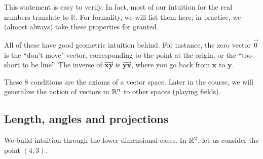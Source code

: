 This statement is easy to verify. In fact, most of our intuition for the real numbers translate to $\mathbb{R}$. For formality, we will list them here; in practice, we (almost always) take these properties for granted.
\begin{remark}
	All of these have good geometric intuition behind. For instance, the zero vector $\vec{0}$ is the ``don't move" vector, corresponding to the point at the origin, or the ``too short to be line''. The inverse of $\overrightarrow{\mathbf{xy}}$ is $\overrightarrow{\mathbf{yx}}$, where you go back from $\mathbf{x}$ to $\mathbf{y}$. \begin{tikzpicture}
		
	\end{tikzpicture}
\end{remark}
\begin{remark}
	These $8$ conditions are the axioms of a vector space. Later in the course, we will generalize the notion of vectors in $\reals^n$ to other spaces (playing fields).
\end{remark}
\subsection{Length, angles and projections}
We build intuition through the lower dimensional cases.
In $\reals^2$, let us consider the point $(4,3)$.\\
\begin{figure}
\end{figure}

